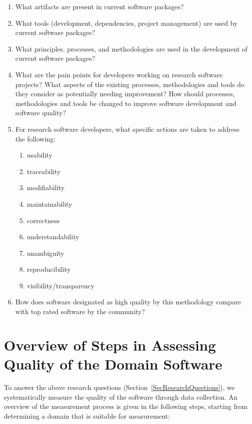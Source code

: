 \documentclass[letterpaper,cleveref]{lipics-v2019}
\begin{document}
\begin{enumerate}
\item What artifacts are present in current software packages? 
\item What tools (development, dependencies, project management) are used by
current software packages?
\item What principles, processes, and methodologies are used in the development
  of current software packages?
\item What are the pain points for developers working on research software
  projects?  What aspects of the existing processes, methodologies and tools do
  they consider as potentially needing improvement?  How should processes,
  methodologies and tools be changed to improve software development and
  software quality?
\item For research software developers, what specific actions are taken to
  address the following:
\begin{enumerate}
\item usability
\item traceability
\item modifiability
\item maintainability
\item correctness
\item understandability
\item unambiguity
\item reproducibility
\item visibility/transparency
\end{enumerate} 
\item How does software designated as high quality by this methodology compare
  with top rated software by the community?
\end{enumerate}

\section{Overview of Steps in Assessing Quality of the Domain Software}
\label{StepsAQDS}

To answer the above research questions (Section~\ref{SecResearchQuestions}), we
systematically measure the quality of the software through data collection.  An
overview of the measurement process is given in the following steps, starting
from determining a domain that is suitable for measurement:
\end{document}
